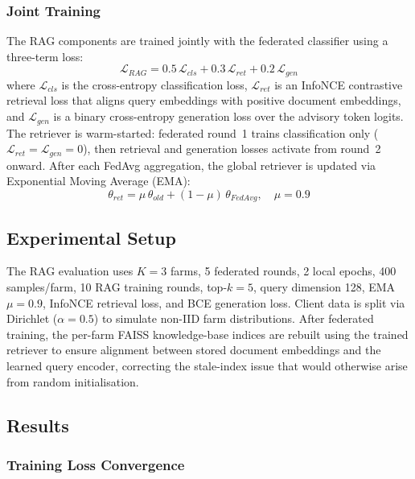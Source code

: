 \documentclass[10pt,journal,compsoc]{IEEEtran}
\begin{document}
\subsubsection{Joint Training}

The RAG components are trained jointly with the federated classifier using a three-term loss:
\begin{equation}
    \mathcal{L}_{RAG} = 0.5\,\mathcal{L}_{cls} + 0.3\,\mathcal{L}_{ret} + 0.2\,\mathcal{L}_{gen}
    \label{eq:rag_loss}
\end{equation}
where $\mathcal{L}_{cls}$ is the cross-entropy classification loss, $\mathcal{L}_{ret}$ is an InfoNCE contrastive retrieval loss that aligns query embeddings with positive document embeddings, and $\mathcal{L}_{gen}$ is a binary cross-entropy generation loss over the advisory token logits. The retriever is warm-started: federated round~1 trains classification only ($\mathcal{L}_{ret}{=}\mathcal{L}_{gen}{=}0$), then retrieval and generation losses activate from round~2 onward. After each FedAvg aggregation, the global retriever is updated via Exponential Moving Average (EMA):
\begin{equation}
    \theta_{ret} = \mu\,\theta_{old} + (1-\mu)\,\theta_{FedAvg},\quad \mu=0.9
    \label{eq:ema}
\end{equation}

\subsection{Experimental Setup}

The RAG evaluation uses $K{=}3$ farms, 5 federated rounds, 2 local epochs, 400 samples/farm, 10 RAG training rounds, top-$k{=}5$, query dimension 128, EMA $\mu{=}0.9$, InfoNCE retrieval loss, and BCE generation loss. Client data is split via Dirichlet ($\alpha{=}0.5$) to simulate non-IID farm distributions. After federated training, the per-farm FAISS knowledge-base indices are rebuilt using the trained retriever to ensure alignment between stored document embeddings and the learned query encoder, correcting the stale-index issue that would otherwise arise from random initialisation.

\subsection{Results}

\subsubsection{Training Loss Convergence}
\end{document}
